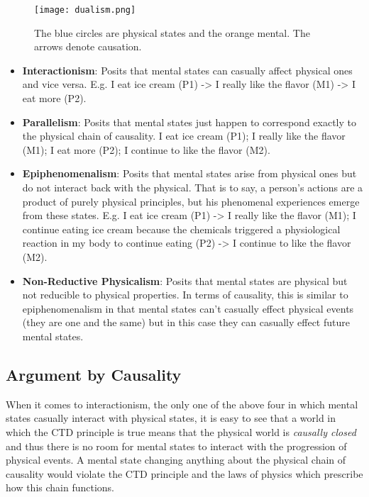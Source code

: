 \documentclass[11pt]{diazessay} %
\begin{document}
		\begin{figure}[H]
			\centering
			\texttt{[image: dualism.png]}
			\captionsetup{justification=centering,margin=2cm}
			\caption{The blue circles are physical states and the orange mental. The arrows denote causation.}
		\end{figure}
		
		\begin{itemize}
			\item \textbf{Interactionism}: Posits that mental states can casually affect physical ones and vice versa. E.g. I eat ice cream (P1) -> I really like the flavor (M1) -> I eat more (P2).
			\item \textbf{Parallelism}: Posits that mental states just happen to correspond exactly to the physical chain of causality. I eat ice cream (P1); I really like the flavor (M1); I eat more (P2); I continue to like the flavor (M2).
			\item \textbf{Epiphenomenalism}: Posits that mental states arise from physical ones but do not interact back with the physical. That is to say, a person's actions are a product of purely physical principles, but his phenomenal experiences emerge from these states. E.g. I eat ice cream (P1) -> I really like the flavor (M1); I continue eating ice cream because the chemicals triggered a physiological reaction in my body to continue eating (P2) -> I continue to like the flavor (M2).
			\item \textbf{Non-Reductive Physicalism}: Posits that mental states are physical but not reducible to physical properties. In terms of causality, this is similar to epiphenomenalism in that mental states can't casually effect physical events (they are one and the same) but in this case they can casually effect future mental states.
		\end{itemize}
	
	\subsection{Argument by Causality}
		When it comes to interactionism, the only one of the above four in which mental states casually interact with physical states, it is easy to see that a world in which the CTD principle is true means that the physical world is \emph{causally closed} and thus there is no room for mental states to interact with the progression of physical events. A mental state changing anything about the physical chain of causality would violate the CTD principle and the laws of physics which prescribe how this chain functions.
\end{document}

